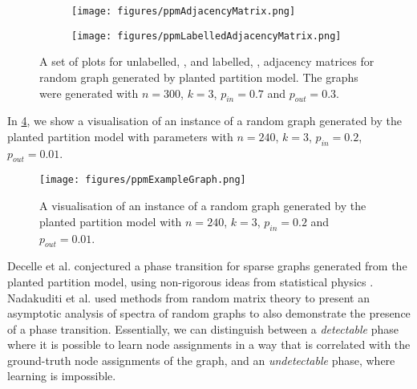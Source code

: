\begin{figure}
	\centering
	\begin{subfigure}{.5\textwidth}
		\centering
		\texttt{[image: figures/ppmAdjacencyMatrix.png]}
		\caption{}
		\label{fig:ppmUnlabelledAdjacencyMatrixPlot}
	\end{subfigure}%
	\begin{subfigure}{.5\textwidth}
		\centering
		\texttt{[image: figures/ppmLabelledAdjacencyMatrix.png]}
		\caption{}
		\label{fig:ppmLabelledAdjacencyMatrixPlot}
	\end{subfigure}
	\caption[Plots of adjacency matrices of graph generated by planted partition model]{\label{fig:ppmAdjacencyMatricesPlots} A set of plots for unlabelled, , and labelled, , adjacency matrices for random graph generated by planted partition model. The graphs were generated with $n = 300$, $k = 3$, $p_{in} = 0.7$ and $p_{out} = 0.3$.}
\end{figure}

In \cref{fig:ppmExampleGraph}, we show a visualisation of an instance of a random graph generated by the planted partition model with parameters with $n = 240$, $k = 3$, $p_{in} = 0.2$, $p_{out} = 0.01$.

\begin{figure}
	\centering
	\texttt{[image: figures/ppmExampleGraph.png]}
	\caption[Visualisation of a graph generated by the planted partition model]{\label{fig:ppmExampleGraph} A visualisation of an instance of a random graph generated by the planted partition model with $n = 240$, $k = 3$, $p_{in} = 0.2$ and $p_{out} = 0.01$.}
\end{figure}

Decelle et al. \cite{DKM+11} conjectured a phase transition for sparse graphs generated from the planted partition model, using non-rigorous ideas from statistical physics \cite{MNS12}.
Nadakuditi et al. \cite{NN12} used methods from random matrix theory to present an asymptotic analysis of spectra of random graphs to also demonstrate the presence of a phase transition.
Essentially, we can distinguish between a \textit{detectable} phase where it is possible to learn node assignments in a way that is correlated with the ground-truth node assignments of the graph, and an \textit{undetectable} phase, where learning is impossible.

